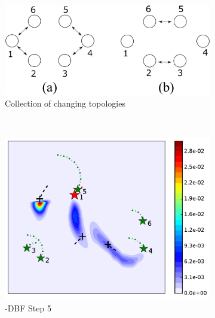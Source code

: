 		
	\begin{figure}%
		\centering
		\begin{subfigure}[b]{0.3\textwidth}
			\includegraphics[width=\textwidth]{figures/com_topo1}
			\caption{Collection of changing topologies}\label{fig:com_topo1}
		\end{subfigure}
		~
		\begin{subfigure}[b]{0.23\textwidth}
			\includegraphics[width=\textwidth]{figures/hetero_mov_sen_mov_tar_rbt1_step5}
			\caption{\proto-DBF Step 5}\label{fig:step5}
		\end{subfigure}
		\begin{subfigure}[b]{0.23\textwidth}

\end{subfigure}
\end{figure}
